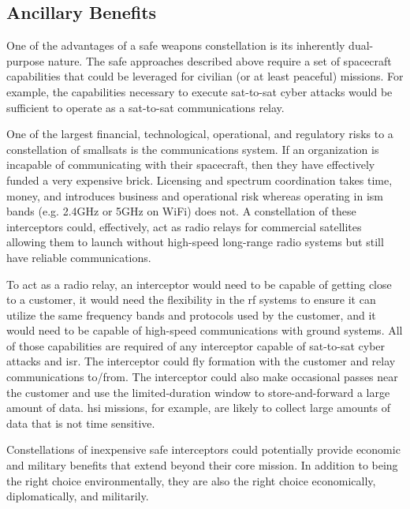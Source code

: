 \subsection{Ancillary Benefits}

One of the advantages of a \ac{safe} weapons constellation is its
inherently dual-purpose nature.  The \ac{safe} approaches described
above require a set of spacecraft capabilities that could be leveraged
for civilian (or at least peaceful) missions.  For example, the
capabilities necessary to execute sat-to-sat cyber attacks would be
sufficient to operate as a sat-to-sat communications relay.

One of the largest financial, technological, operational, and
regulatory risks to a constellation of smallsats is the communications
system.  If an organization is incapable of communicating with their
spacecraft, then they have effectively funded a very expensive brick.
Licensing and spectrum coordination takes time, money, and introduces
business and operational risk whereas operating in \ac{ism} bands
(e.g. 2.4GHz or 5GHz on WiFi) does not.  A constellation of these
interceptors could, effectively, act as radio relays for commercial
satellites allowing them to launch without high-speed long-range radio
systems but still have reliable communications.

To act as a radio relay, an interceptor would need to be capable of
getting close to a customer, it would need the flexibility in the
\ac{rf} systems to ensure it can utilize the same frequency bands and
protocols used by the customer, and it would need to be capable of
high-speed communications with ground systems.  All of those
capabilities are required of any interceptor capable of sat-to-sat
cyber attacks and \ac{isr}.  The interceptor could fly formation with
the customer and relay communications to/from.  The interceptor could
also make occasional passes near the customer and use the
limited-duration window to store-and-forward a large amount of data.
\ac{hsi} missions, for example, are likely to collect large amounts of
data that is not time sensitive.

Constellations of inexpensive \ac{safe} interceptors could potentially
provide economic and military benefits that extend beyond their core
mission.  In addition to being the right choice environmentally, they
are also the right choice economically, diplomatically, and
militarily.
